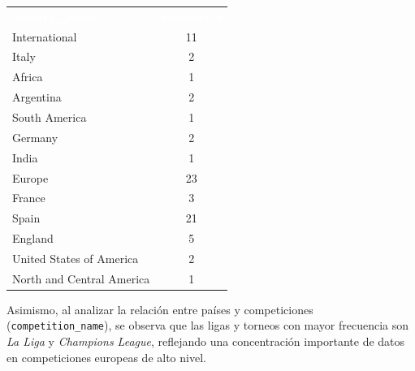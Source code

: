 \documentclass[12pt,a4paper]{article}
\newcommand{\thead}[1]{%
  \cellcolor{tableheader}\textcolor{white}{\textbf{#1}}%
}
\begin{document}
\begin{center}
\begin{tabular}{lc}
\rowcolor{tableheader} \thead{country\_name} & \thead{Frecuencia} \\

\rowcolor{tablealt} International & 11 \\
\rowcolor{tablerow} Italy & 2 \\
\rowcolor{tablealt} Africa & 1 \\
\rowcolor{tablerow} Argentina & 2 \\
\rowcolor{tablealt} South America & 1 \\
\rowcolor{tablerow} Germany & 2 \\
\rowcolor{tablealt} India & 1 \\
\rowcolor{tablerow} Europe & 23 \\
\rowcolor{tablealt} France & 3 \\
\rowcolor{tablerow} Spain & 21 \\
\rowcolor{tablealt} England & 5 \\
\rowcolor{tablerow} United States of America & 2 \\
\rowcolor{tablealt} North and Central America & 1 \\

\end{tabular}
\end{center}

\vspace{0.3cm}

Asimismo, al analizar la relación entre países y competiciones (\texttt{competition\_name}), se observa que las ligas y torneos con mayor frecuencia son \textit{La Liga} y \textit{Champions League}, reflejando una concentración importante de datos en competiciones europeas de alto nivel.
\end{document}

